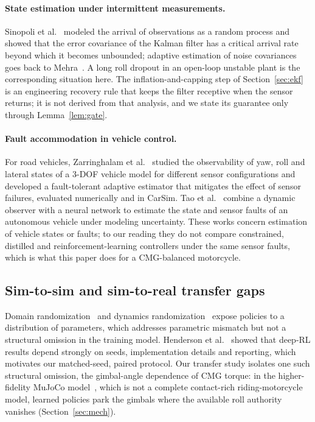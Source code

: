\documentclass[preprint,12pt,authoryear=false]{elsarticle}
\theoremstyle{remark}\newtheorem{remark}{Remark}
\theoremstyle{plain}\newtheorem{proposition}{Proposition}\newtheorem{lemma}{Lemma}
\theoremstyle{definition}\newtheorem{assumption}{Assumption}
\begin{document}
\paragraph{State estimation under intermittent measurements.}
Sinopoli et al.~\cite{sinopoli2004kalman} modeled the arrival of observations as a random process and showed that the error covariance of the Kalman filter has a critical arrival rate beyond which it becomes unbounded; adaptive estimation of noise covariances goes back to Mehra~\cite{mehra1970identification}. A long roll dropout in an open-loop unstable plant is the corresponding situation here. The inflation-and-capping step of Section~\ref{sec:ekf} is an engineering recovery rule that keeps the filter receptive when the sensor returns; it is not derived from that analysis, and we state its guarantee only through Lemma~\ref{lem:gate}.

\paragraph{Fault accommodation in vehicle control.}
For road vehicles, Zarringhalam et al.~\cite{zarringhalam2013optimal} studied the observability of yaw, roll and lateral states of a 3-DOF vehicle model for different sensor configurations and developed a fault-tolerant adaptive estimator that mitigates the effect of sensor failures, evaluated numerically and in CarSim. Tao et al.~\cite{tao2024simultaneous} combine a dynamic observer with a neural network to estimate the state and sensor faults of an autonomous vehicle under modeling uncertainty. These works concern estimation of vehicle states or faults; to our reading they do not compare constrained, distilled and reinforcement-learning controllers under the same sensor faults, which is what this paper does for a CMG-balanced motorcycle.

\subsection{Sim-to-sim and sim-to-real transfer gaps}
Domain randomization~\cite{tobin2017domain} and dynamics randomization~\cite{peng2018sim} expose policies to a distribution of parameters, which addresses parametric mismatch but not a structural omission in the training model. Henderson et al.~\cite{henderson2018deep} showed that deep-RL results depend strongly on seeds, implementation details and reporting, which motivates our matched-seed, paired protocol. Our transfer study isolates one such structural omission, the gimbal-angle dependence of CMG torque: in the higher-fidelity MuJoCo model~\cite{todorov2012mujoco}, which is not a complete contact-rich riding-motorcycle model, learned policies park the gimbals where the available roll authority vanishes (Section~\ref{sec:mech}).
\end{document}
